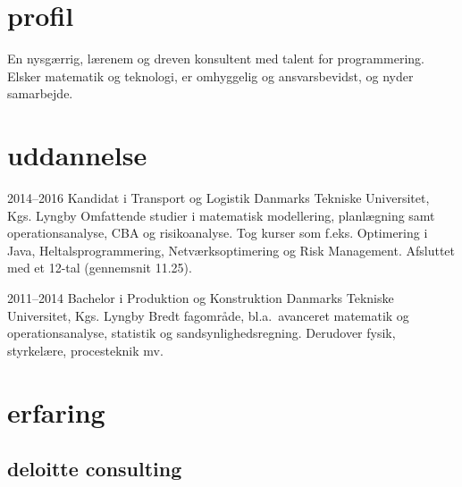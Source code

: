 \documentclass[]{../friggeri-cv} %
\begin{document}
\section{profil}
En nysgærrig, lærenem og dreven konsultent med talent for programmering. Elsker matematik og teknologi, er omhyggelig og ansvarsbevidst, og nyder samarbejde. 
\section{uddannelse}
\begin{entrylist}
\entry
{2014--2016}
{Kandidat {\normalfont i Transport og Logistik}}
{Danmarks Tekniske Universitet, Kgs. Lyngby}
{Omfattende studier i matematisk modellering, planlægning samt operationsanalyse, CBA og risikoanalyse. Tog kurser som f.eks. Optimering i Java, Heltalsprogrammering, Netværksoptimering og Risk Management. Afsluttet med et 12-tal (gennemsnit 11.25).
}


\entry
{2011--2014}
{Bachelor {\normalfont i Produktion og Konstruktion}}
{Danmarks Tekniske Universitet, Kgs. Lyngby}
{Bredt fagområde, bl.a.\ avanceret matematik og operationsanalyse, statistik og sandsynlighedsregning. Derudover fysik, styrkelære, procesteknik mv.}

\end{entrylist}


\section{erfaring}

\subsection{deloitte consulting}
\end{document}
